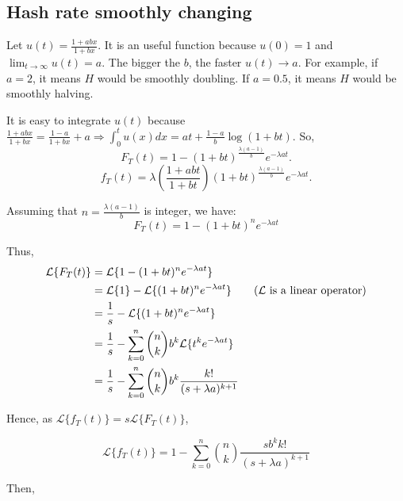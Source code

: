 
\subsection{Hash rate smoothly changing}

Let $u(t) = \frac{1+abx}{1+bx}$. It is an useful function because $u(0) = 1$ and $\lim_{t \rightarrow \infty} u(t) = a$. The bigger the $b$, the faster $u(t) \rightarrow a$. For example, if $a=2$, it means $H$ would be smoothly doubling. If $a=0.5$, it means $H$ would be smoothly halving.

It is easy to integrate $u(t)$ because $\frac{1+abx}{1+bx} = \frac{1-a}{1+bx} + a \Rightarrow \int_0^t u(x) dx = at + \frac{1-a}{b} \log(1+bt)$. So,
$$F_T(t) = 1 - (1+bt)^{\frac{\lambda(a-1)}{b}} e^{-\lambda at}.$$
$$f_T(t) = \lambda \left( \frac{1+abt}{1+bt} \right) (1+bt)^{\frac{\lambda(a-1)}{b}} e^{-\lambda at}.$$

Assuming that $n = \frac{\lambda(a-1)}{b}$ is integer, we have:
$$F_T(t) = 1 - (1+bt)^n e^{-\lambda at}$$

Thus,
\begin{align*}
\mathcal{L}\{F_T(t)\} &= \mathcal{L}\{1 - (1+bt)^n e^{-\lambda at}\} \\
	&= \mathcal{L}\{1\} - \mathcal{L}\{(1+bt)^n e^{-\lambda at}\} \tag{$\mathcal{L}$ is a linear operator} \\
	&= \frac{1}{s} - \mathcal{L}\{(1+bt)^n e^{-\lambda at}\} \\
	&= \frac{1}{s} - \sum_{k=0}^n \binom{n}{k} b^k \mathcal{L}\{t^k e^{-\lambda at}\} \\
	&= \frac{1}{s} - \sum_{k=0}^n \binom{n}{k} b^k \frac{k!}{(s+\lambda a)^{k+1}}
\end{align*}

Hence, as $\mathcal{L}\{f_T(t)\} = s \mathcal{L}\{F_T(t)\}$,

$$\mathcal{L}\{f_T(t)\} = 1 - \sum_{k=0}^n \binom{n}{k} \frac{s b^k k!}{(s+\lambda a)^{k+1}}$$

Then,

